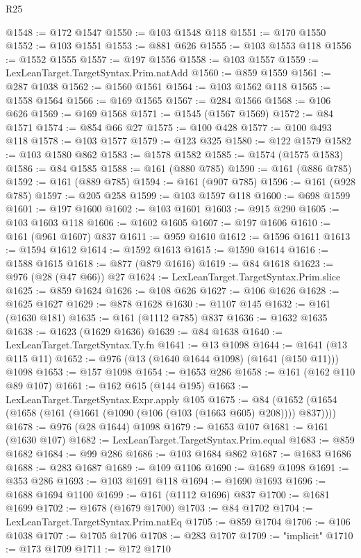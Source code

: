 \begin{lexlean}{R25}
\begin{coremodule}
@1548 := @172 @1547
@1550 := @103 @1548 @118
@1551 := @170 @1550
@1552 := @103 @1551
@1553 := @881 @626
@1555 := @103 @1553 @118
@1556 := @1552 @1555
@1557 := @197 @1556
@1558 := @103 @1557
@1559 := LexLeanTarget.TargetSyntax.Prim.natAdd
@1560 := @859 @1559
@1561 := @287 @1038
@1562 := @1560 @1561
@1564 := @103 @1562 @118
@1565 := @1558 @1564
@1566 := @169 @1565
@1567 := @284 @1566
@1568 := @106 @626
@1569 := @169 @1568
@1571 := @1545 (@1567 @1569)
@1572 := @84 @1571
@1574 := @854 @66 @27
@1575 := @100 @428
@1577 := @100 @493 @118
@1578 := @103 @1577
@1579 := @123 @325
@1580 := @122 @1579
@1582 := @103 @1580 @862
@1583 := @1578 @1582
@1585 := @1574 (@1575 @1583)
@1586 := @84 @1585
@1588 := @161 (@880 @785)
@1590 := @161 (@886 @785)
@1592 := @161 (@889 @785)
@1594 := @161 (@907 @785)
@1596 := @161 (@928 @785)
@1597 := @205 @258
@1599 := @103 @1597 @118
@1600 := @698 @1599
@1601 := @197 @1600
@1602 := @103 @1601
@1603 := @915 @290
@1605 := @103 @1603 @118
@1606 := @1602 @1605
@1607 := @197 @1606
@1610 := @161 (@961 @1607) @837
@1611 := @959 @1610
@1612 := @1596 @1611
@1613 := @1594 @1612
@1614 := @1592 @1613
@1615 := @1590 @1614
@1616 := @1588 @1615
@1618 := @877 (@879 @1616)
@1619 := @84 @1618
@1623 := @976 (@28 (@47 @66)) @27
@1624 := LexLeanTarget.TargetSyntax.Prim.slice
@1625 := @859 @1624
@1626 := @108 @626
@1627 := @106 @1626
@1628 := @1625 @1627
@1629 := @878 @1628
@1630 := @1107 @145
@1632 := @161 (@1630 @181)
@1635 := @161 (@1112 @785) @837
@1636 := @1632 @1635
@1638 := @1623 (@1629 @1636)
@1639 := @84 @1638
@1640 := LexLeanTarget.TargetSyntax.Ty.fn
@1641 := @13 @1098
@1644 := @1641 (@13 @115 @11)
@1652 := @976 (@13 (@1640 @1644 @1098) (@1641 (@150 @11))) @1098
@1653 := @157 @1098
@1654 := @1653 @286
@1658 := @161 (@162 @110 @89 @107)
@1661 := @162 @615 (@144 @195)
@1663 := LexLeanTarget.TargetSyntax.Expr.apply @105
@1675 := @84 (@1652 (@1654 (@1658 (@161 (@1661 (@1090 (@106 (@103 (@1663 @605) @208)))) @837))))
@1678 := @976 (@28 @1644) @1098
@1679 := @1653 @107
@1681 := @161 (@1630 @107)
@1682 := LexLeanTarget.TargetSyntax.Prim.equal
@1683 := @859 @1682
@1684 := @99 @286
@1686 := @103 @1684 @862
@1687 := @1683 @1686
@1688 := @283 @1687
@1689 := @109 @1106
@1690 := @1689 @1098
@1691 := @353 @286
@1693 := @103 @1691 @118
@1694 := @1690 @1693
@1696 := @1688 @1694 @1100
@1699 := @161 (@1112 @1696) @837
@1700 := @1681 @1699
@1702 := @1678 (@1679 @1700)
@1703 := @84 @1702
@1704 := LexLeanTarget.TargetSyntax.Prim.natEq
@1705 := @859 @1704
@1706 := @106 @1038
@1707 := @1705 @1706
@1708 := @283 @1707
@1709 := "implicit"
@1710 := @173 @1709
@1711 := @172 @1710

\end{coremodule}
\end{lexlean}

